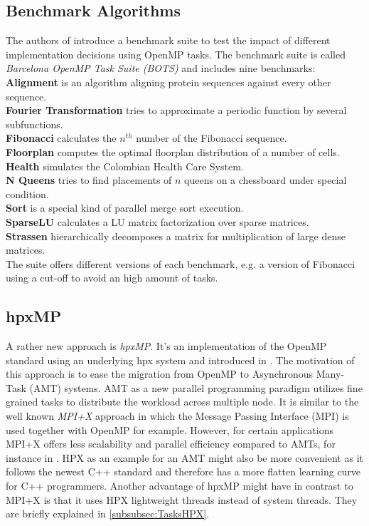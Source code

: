      
\subsection{Benchmark Algorithms}
\label{subsec:BOTS}
  The authors of \cite{Duran.2009} introduce a benchmark suite to test the impact of different implementation decisions using OpenMP tasks.
  The benchmark suite is called \textit{Barcelona OpenMP Task Suite (BOTS)} and includes nine benchmarks:\\
    \textbf{Alignment} is an algorithm aligning protein sequences against every other sequence.\\
    \textbf{Fourier Transformation} tries to approximate a periodic function by several subfunctions.\\
    \textbf{Fibonacci} calculates the \(n^{th}\) number of the Fibonacci sequence.\\
    \textbf{Floorplan} computes the optimal floorplan distribution of a number of cells.\\
    \textbf{Health} simulates the Colombian Health Care System.\\
    \textbf{N Queens} tries to find placements of \(n\) queens on a chessboard under special condition.\\
    \textbf{Sort} is a special kind of parallel merge sort execution.\\
    \textbf{SparseLU} calculates a LU matrix factorization over sparse matrices.\\
    \textbf{Strassen} hierarchically decomposes a matrix for multiplication of large dense matrices.\\
  The suite offers different versions of each benchmark, e.g. a version of Fibonacci using a cut-off to avoid an high amount of tasks.
 
 
\subsection{hpxMP}
  A rather new approach is \textit{hpxMP}.
  It's an implementation of the OpenMP standard using an underlying hpx system and introduced in \cite{hpxMP.2019}.
  The motivation of this approach is to ease the migration from OpenMP to Asynchronous Many-Task (AMT) systems.
  AMT as a new parallel programming paradigm utilizes fine grained tasks to distribute the workload across multiple node.
  It is similar to the well known \textit{MPI+X} approach in which the Message Passing Interface (MPI) is used together with OpenMP for example.
  However, for certain applications MPI+X offers less scalability and parallel efficiency compared to AMTs, for instance in \cite{Dai.11172019}.
  HPX as an example for an AMT might also be more convenient as it follows the newest C++ standard and therefore has a more flatten learning curve for C++ programmers.
  Another advantage of hpxMP might have in contrast to MPI+X is that it uses HPX lightweight threads instead of system threads.
  They are briefly explained in \ref{subsubsec:TasksHPX}.
  
